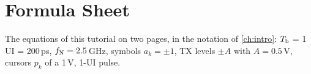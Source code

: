 \providecommand{\appGrp}[1]{\rowcolor{btint}\multicolumn{2}{@{}l}{\sffamily\bfseries\color{navy}#1}\\}
\providecommand{\appBox}{$\square$}

\chapter{Formula Sheet}\label{app:formulas}

The equations of this tutorial on two pages, in the notation of \cref{ch:intro}: $T_\mathrm{b}$ = 1\,UI = 200\,ps, $f_\mathrm{N}=2.5$\,GHz, symbols $a_k=\pm1$, TX levels $\pm A$ with $A=0.5$\,V, cursors $p_k$ of a 1\,V, 1-UI pulse.

